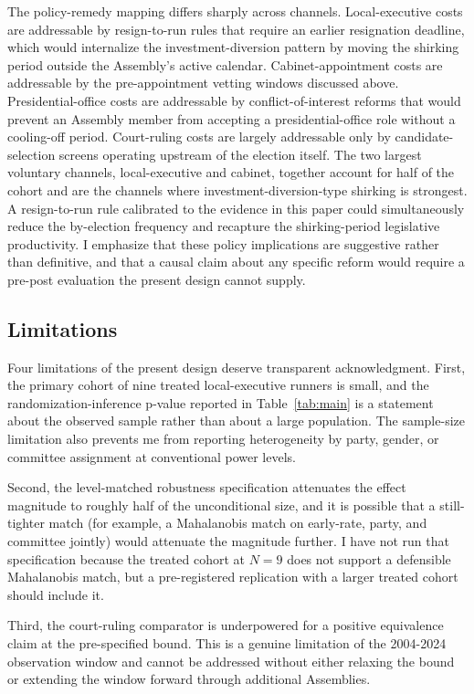 \documentclass[11pt]{article}
\begin{document}
The policy-remedy mapping differs sharply across channels. Local-executive costs are addressable by resign-to-run rules that require an earlier resignation deadline, which would internalize the investment-diversion pattern by moving the shirking period outside the Assembly's active calendar. Cabinet-appointment costs are addressable by the pre-appointment vetting windows discussed above. Presidential-office costs are addressable by conflict-of-interest reforms that would prevent an Assembly member from accepting a presidential-office role without a cooling-off period. Court-ruling costs are largely addressable only by candidate-selection screens operating upstream of the election itself. The two largest voluntary channels, local-executive and cabinet, together account for half of the cohort and are the channels where investment-diversion-type shirking is strongest. A resign-to-run rule calibrated to the evidence in this paper could simultaneously reduce the by-election frequency and recapture the shirking-period legislative productivity. I emphasize that these policy implications are suggestive rather than definitive, and that a causal claim about any specific reform would require a pre-post evaluation the present design cannot supply.

\subsection{Limitations}

Four limitations of the present design deserve transparent acknowledgment. First, the primary cohort of nine treated local-executive runners is small, and the randomization-inference p-value reported in Table~\ref{tab:main} is a statement about the observed sample rather than about a large population. The sample-size limitation also prevents me from reporting heterogeneity by party, gender, or committee assignment at conventional power levels.

Second, the level-matched robustness specification attenuates the effect magnitude to roughly half of the unconditional size, and it is possible that a still-tighter match (for example, a Mahalanobis match on early-rate, party, and committee jointly) would attenuate the magnitude further. I have not run that specification because the treated cohort at $N = 9$ does not support a defensible Mahalanobis match, but a pre-registered replication with a larger treated cohort should include it.

Third, the court-ruling comparator is underpowered for a positive equivalence claim at the pre-specified bound. This is a genuine limitation of the 2004-2024 observation window and cannot be addressed without either relaxing the bound or extending the window forward through additional Assemblies.
\end{document}
